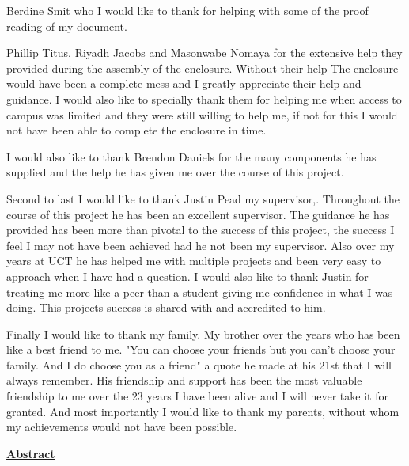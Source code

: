 \documentclass[a4paper,11pt]{article}
\numberwithin{figure}{section}
\numberwithin{table}{section}
\begin{document}
	Berdine Smit who I would like to thank for helping with some of the proof reading of my document. %
	
	Phillip Titus, Riyadh Jacobs and Masonwabe Nomaya for the extensive help they provided during the assembly of the enclosure. Without their help The enclosure would have been a complete mess and I greatly appreciate their help and guidance. I would also like to specially thank them for helping me when access to campus was limited and they were still willing to help me, if not for this I would not have been able to complete the enclosure in time.
	
	I would also like to thank Brendon Daniels for the many components he has supplied and the help he has given me over the course of this project.
	
Second to last I would like to thank Justin Pead my supervisor,. Throughout the course of this project he has been an excellent supervisor. The guidance he has provided has been more than pivotal to the success of this project, the success I feel I may not have been achieved had he not been my supervisor. Also over my years at UCT he has helped me with multiple projects and been very easy to approach when I have had a question. I would also like to thank Justin for treating me more like a peer than a student giving me confidence in what I was doing. This projects success is shared with and accredited to him.

Finally I would like to thank my family. My brother over the years who has been like a best friend to me. "You can choose your friends but you can't choose your family. And I do choose you as a friend" a quote he made at his 21st that I will always remember. His friendship and support has been the most valuable friendship to me over the 23 years I have been alive and I will never take it for granted. And most importantly I would like to thank my parents, without whom my achievements would not have been possible.
	\newpage
	
	{\centering\Huge\bfseries\underline{Abstract}\par}
	\newpage	
	\tableofcontents
	\newpage
	\listoffigures
	\newpage
	\listoftables
	\newpage
	
\end{document}
